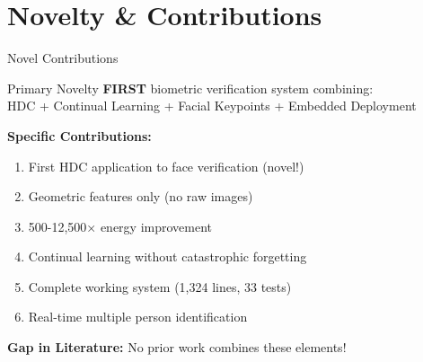 \documentclass[aspectratio=169]{beamer}
\begin{document}
\section{Novelty \& Contributions}

\begin{frame}{Novel Contributions}
\begin{block}{Primary Novelty}
\textbf{FIRST} biometric verification system combining:\\
HDC + Continual Learning + Facial Keypoints + Embedded Deployment
\end{block}

\textbf{Specific Contributions:}
\begin{enumerate}
    \item {} First HDC application to face verification (novel!)
    \item {} Geometric features only (no raw images)
    \item {} 500-12,500× energy improvement
    \item {} Continual learning without catastrophic forgetting
    \item {} Complete working system (1,324 lines, 33 tests)
    \item {} Real-time multiple person identification
\end{enumerate}

\textbf{Gap in Literature:} No prior work combines these elements!
\end{frame}
\end{document}
